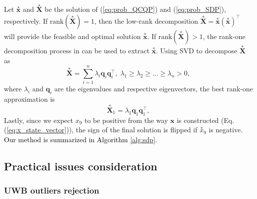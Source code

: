 \documentclass[journal]{IEEEtran}
\begin{document}
Let $\overset{*}{\mathbf{x}}$ and $\overset{*}{\mathbf{X}}$ be the solution of (\ref{eq:prob_QCQP}) and (\ref{eq:prob_SDP}), respectively. If $\textrm{rank}(\overset{*}{\mathbf{X}}) = 1$, then the low-rank decomposition $\overset{*}{\mathbf{X}} = \overset{*}{\mathbf{x}} (\overset{*}{\mathbf{x}})^\top$ will provide the feasible and optimal solution $\overset{*}{\mathbf{x}}$. If $\textrm{rank}(\overset{*}{\mathbf{X}}) > 1$, the rank-one decomposition process in \cite{luo2010sdp} can be used to extract $\overset{*}{\mathbf{x}}$. Using SVD to decompose $\overset{*}{\mathbf{X}}$ as
\begin{equation}
    \overset{*}{\mathbf{X}} = \sum\limits_{i=1}^{n} \lambda_i \mathbf{q}_i \mathbf{q}_i^\top,\; \lambda_1 \geq \lambda_2 \geq \dots \geq \lambda_n > 0,
\end{equation}
where $\lambda_i$ and $\mathbf{q}_i$ are the eigenvalues and respective eigenvectors, the best rank-one approximation is
\begin{equation}
    \overset{*}{\mathbf{X}}_1 = \lambda_1  \mathbf{q}_1  \mathbf{q}_1^\top,
\end{equation}
Lastly, since we expect $x_9$ to be positive from the way $\mathbf{x}$ is constructed (Eq. (\ref{eq:x_state_vector})), the sign of the final solution is flipped if ${\overset{*}{x}_9}$ is negative. \textcolor{black}{Our method is summarized in Algorithm \ref{alg:sdp}.}

\subsection{Practical issues consideration}
\subsubsection{UWB outliers rejection} \label{subsubsec:good_practice_uwb_outlier}

\end{document}
